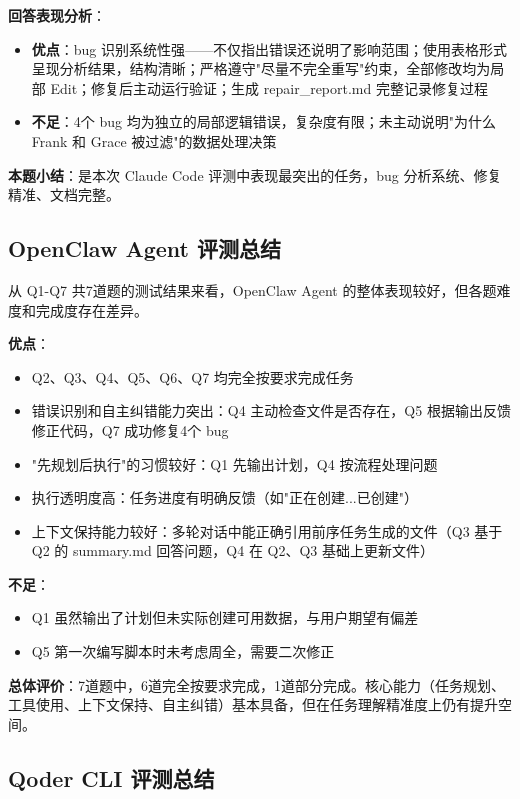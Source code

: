 \documentclass[a4paper]{article}
\begin{document}
\textbf{回答表现分析}：

\begin{itemize}
    \item \textbf{优点}：bug 识别系统性强——不仅指出错误还说明了影响范围；使用表格形式呈现分析结果，结构清晰；严格遵守"尽量不完全重写"约束，全部修改均为局部 Edit；修复后主动运行验证；生成 repair\_report.md 完整记录修复过程
    \item \textbf{不足}：4个 bug 均为独立的局部逻辑错误，复杂度有限；未主动说明"为什么 Frank 和 Grace 被过滤"的数据处理决策
\end{itemize}

\textbf{本题小结}：是本次 Claude Code 评测中表现最突出的任务，bug 分析系统、修复精准、文档完整。
\subsection{OpenClaw Agent 评测总结}

从 Q1-Q7 共7道题的测试结果来看，OpenClaw Agent 的整体表现较好，但各题难度和完成度存在差异。

\textbf{优点}：

\begin{itemize}
    \item Q2、Q3、Q4、Q5、Q6、Q7 均完全按要求完成任务
    \item 错误识别和自主纠错能力突出：Q4 主动检查文件是否存在，Q5 根据输出反馈修正代码，Q7 成功修复4个 bug
    \item "先规划后执行"的习惯较好：Q1 先输出计划，Q4 按流程处理问题
    \item 执行透明度高：任务进度有明确反馈（如"正在创建...已创建"）
    \item 上下文保持能力较好：多轮对话中能正确引用前序任务生成的文件（Q3 基于 Q2 的 summary.md 回答问题，Q4 在 Q2、Q3 基础上更新文件）
\end{itemize}

\textbf{不足}：

\begin{itemize}
    \item Q1 虽然输出了计划但未实际创建可用数据，与用户期望有偏差
    \item Q5 第一次编写脚本时未考虑周全，需要二次修正
\end{itemize}

\textbf{总体评价}：7道题中，6道完全按要求完成，1道部分完成。核心能力（任务规划、工具使用、上下文保持、自主纠错）基本具备，但在任务理解精准度上仍有提升空间。

\subsection{Qoder CLI 评测总结}
\end{document}
